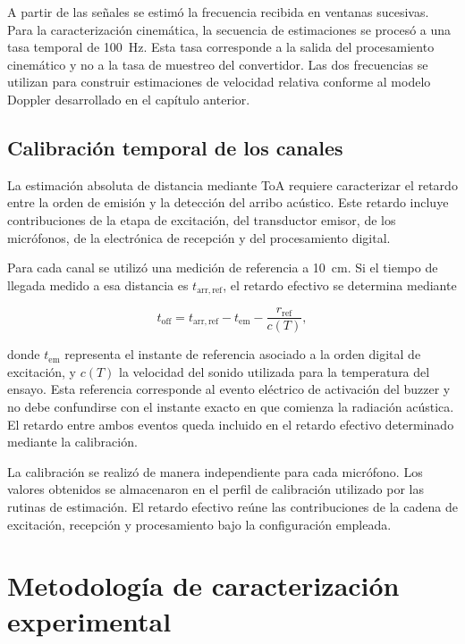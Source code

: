 A partir de las señales se estimó la frecuencia recibida en
ventanas sucesivas. Para la caracterización cinemática, la
secuencia de estimaciones se procesó a una tasa temporal de
\SI{100}{Hz}. Esta tasa corresponde a la salida del
procesamiento cinemático y no a la tasa de muestreo del
convertidor. Las dos frecuencias se utilizan para construir
estimaciones de velocidad relativa conforme al modelo Doppler
desarrollado en el capítulo anterior.

\subsection{Calibración temporal de los canales}

La estimación absoluta de distancia mediante ToA requiere
caracterizar el retardo entre la orden de emisión y la
detección del arribo acústico. Este retardo incluye
contribuciones de la etapa de excitación, del transductor
emisor, de los micrófonos, de la electrónica de recepción
y del procesamiento digital.

Para cada canal se utilizó una medición de referencia a
\SI{10}{\centi\metre}. Si el tiempo de llegada medido a
esa distancia es $t_{\mathrm{arr,ref}}$, el retardo efectivo
se determina mediante

\begin{equation}
    t_{\mathrm{off}} =
    t_{\mathrm{arr,ref}}
    -t_{\mathrm{em}}
    -\frac{r_{\mathrm{ref}}}{c(T)},
    \label{eq:offset_calibracion_exp}
\end{equation}

donde $t_{\mathrm{em}}$ representa el instante de referencia
asociado a la orden digital de excitación, y $c(T)$ la
velocidad del sonido utilizada para la temperatura del ensayo.
Esta referencia corresponde al evento eléctrico de activación
del buzzer y no debe confundirse con el instante exacto en
que comienza la radiación acústica. El retardo entre ambos
eventos queda incluido en el retardo efectivo determinado
mediante la calibración.

La calibración se realizó de manera independiente para
cada micrófono. Los valores obtenidos se almacenaron en el
perfil de calibración utilizado por las rutinas de
estimación. El retardo efectivo reúne las contribuciones
de la cadena de excitación, recepción y procesamiento bajo
la configuración empleada.

\section{Metodología de caracterización experimental}
\label{sec:metodologia_experimental}

